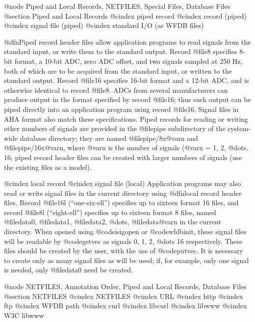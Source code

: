 {{{{{{{{{@node     Piped and Local Records, NETFILES, Special Files, Database Files
@section Piped and Local Records
@cindex piped record
@cindex record (piped)
@cindex signal file (piped)
@cindex standard I/O (as WFDB files)

@dfn{Piped record} header files allow application programs to read signals from
the standard input, or write them to the standard output.  Record @file{8}
specifies 8-bit format, a 10-bit ADC, zero ADC offset, and two signals sampled
at 250 Hz, both of which are to be acquired from the standard input, or written
to the standard output.  Record @file{16} specifies 16-bit format and a 12-bit
ADC, and is otherwise identical to record @file{8}.  ADCs from several
manufacturers can produce output in the format specified by record @file{16};
thus such output can be piped directly into an application program using record
@file{16}.  Signal files in AHA format also match these specifications.  Piped
records for reading or writing other numbers of signals are provided in the
@file{pipe} subdirectory of the system-wide database directory; they are named
@file{pipe/8x@var{n}} and @file{pipe/16x@var{n}}, where @var{n} is the number
of signals (@var{n} = 1, 2, @dots{}, 16; piped record header files can be
created with larger numbers of signals (use the existing files as a model).

@cindex local record
@cindex signal file (local)
Application programs may also read or write signal files in the current
directory using @dfn{local record} header files.  Record
@file{16l} (``one-six-ell'') specifies up to sixteen format 16
files, and record @file{8l} (``eight-ell'') specifies up to
sixteen format 8 files, named @file{data0}, @file{data1},
@file{data2}, @dots{}, @file{data@var{n}} in the current directory.
When opened using @code{isigopen} or @code{wfdbinit}, these signal files
will be readable by @code{getvec} as signals 0, 1, 2, @dots{} 16
respectively.  These files should be created by the user, with the use
of @code{putvec}.  It is necessary to create only as many signal files
as will be used; if, for example, only one signal is needed, only
@file{data0} need be created.


@node     NETFILES, Annotation Order, Piped and Local Records, Database Files
@section NETFILES
@cindex NETFILES
@cindex URL
@cindex http
@cindex ftp
@cindex WFDB path
@cindex curl
@cindex libcurl
@cindex libwww
@cindex W3C libwww

}}}}}}}}}
